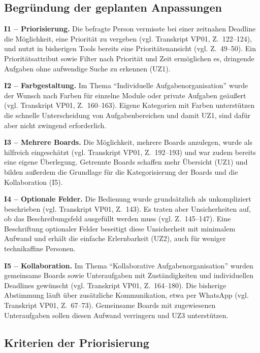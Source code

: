 \subsection{Begründung der geplanten Anpassungen}
\label{subsec:issues_begruendung}

\textbf{I1 -- Priorisierung.}
Die befragte Person vermisste bei einer zeitnahen Deadline die Möglichkeit, eine Priorität zu vergeben (vgl. Transkript VP01, Z.~122--124), und nutzt in bisherigen Tools bereits eine Prioritätenansicht (vgl. Z.~49--50).
Ein Prioritätsattribut sowie Filter nach Priorität und Zeit ermöglichen es, dringende Aufgaben ohne aufwendige Suche zu erkennen (UZ1).

\textbf{I2 -- Farbgestaltung.}
Im Thema \enquote{Individuelle Aufgabenorganisation} wurde der Wunsch nach Farben für einzelne Module oder private Aufgaben geäußert (vgl. Transkript VP01, Z.~160--163).
Eigene Kategorien mit Farben unterstützen die schnelle Unterscheidung von Aufgabenbereichen und damit UZ1, sind dafür aber nicht zwingend erforderlich.

\textbf{I3 -- Mehrere Boards.}
Die Möglichkeit, mehrere Boards anzulegen, wurde als hilfreich eingeschätzt (vgl. Transkript VP01, Z.~192--193) und war zudem bereits eine eigene Überlegung.
Getrennte Boards schaffen mehr Übersicht (UZ1) und bilden außerdem die Grundlage für die Kategorisierung der Boards und die Kollaboration (I5).

\textbf{I4 -- Optionale Felder.}
Die Bedienung wurde grundsätzlich als unkompliziert beschrieben (vgl. Transkript VP01, Z.~143).
Es traten aber Unsicherheiten auf, ob das Beschreibungsfeld ausgefüllt werden muss (vgl. Z.~145--147).
Eine Beschriftung optionaler Felder beseitigt diese Unsicherheit mit minimalem Aufwand und erhält die einfache Erlernbarkeit (UZ2), auch für weniger technikaffine Personen.

\textbf{I5 -- Kollaboration.}
Im Thema \enquote{Kollaborative Aufgabenorganisation} wurden gemeinsame Boards sowie Unteraufgaben mit Zuständigkeiten und individuellen Deadlines gewünscht (vgl. Transkript VP01, Z.~164--180).
Die bisherige Abstimmung läuft über zusätzliche Kommunikation, etwa per WhatsApp (vgl. Transkript VP01, Z.~67--73).
Gemeinsame Boards mit zugewiesenen Unteraufgaben sollen diesen Aufwand verringern und UZ3 unterstützen.%

\subsection{Kriterien der Priorisierung}
\label{subsec:issues_kriterien}

